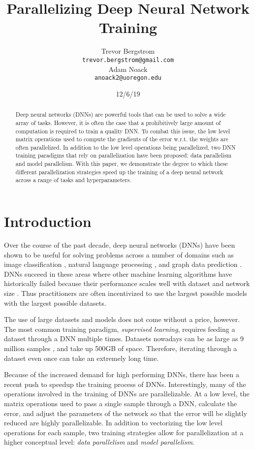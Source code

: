 \documentclass[11pt,a4paper]{article}
\title{Parallelizing Deep Neural Network Training}
\author{Trevor Bergstrom \\
  \texttt{trevor.bergstrom@gmail.com} \\\And
  Adam Noack \\
  \texttt{anoack2@uoregon.edu} \\}
\date{12/6/19}
\begin{document}
\maketitle
\begin{abstract}
Deep neural networks (DNNs) are powerful tools that can be used to solve a wide array of tasks. However, it is often the case that a prohibitively large amount of computation is required to train a quality DNN. To combat this issue, the low level matrix operations used to compute the gradients of the error w.r.t. the weights are often parallelized. In addition to the low level operations being parallelized, two DNN training paradigms that rely on parallelization have been proposed: data parallelism and model parallelism. With this paper, we demonstrate the degree to which these different parallelization strategies speed up the training of a deep neural network across a range of tasks and hyperparameters.
\end{abstract}

\section{Introduction}
Over the course of the past decade, deep neural networks (DNNs) have been shown to be useful for solving problems across a number of domains such as image classification \cite{alexnet}, natural language processing \cite{rnn}, and graph data prediction \cite{gcn}. DNNs succeed in these areas where other machine learning algorithms have historically failed because their performance scales well with dataset and network size \cite{dl_book}. Thus practitioners are often incentivized to use the largest possible models with the largest possible datasets. 

The use of large datasets and models does not come without a price, however. The most common training paradigm, \textit{supervised learning}, requires feeding a dataset through a DNN multiple times. Datasets nowadays can be as large as 9 million samples \cite{openimages}, and take up 500GB of space. Therefore, iterating through a dataset even once can take an extremely long time.

Because of the increased demand for high performing DNNs, there has been a recent push to speedup the training process of DNNs. Interestingly, many of the operations involved in the training of DNNs are parallelizable. At a low level, the matrix operations used to pass a single sample through a DNN, calculate the error, and adjust the parameters of the network so that the error will be slightly reduced are highly parallelizable. In addition to vectorizing the low level operations for each sample, two training strategies allow for parallelization at a higher conceptual level: \textit{data parallelism} and \textit{model parallelism}.
\end{document}
